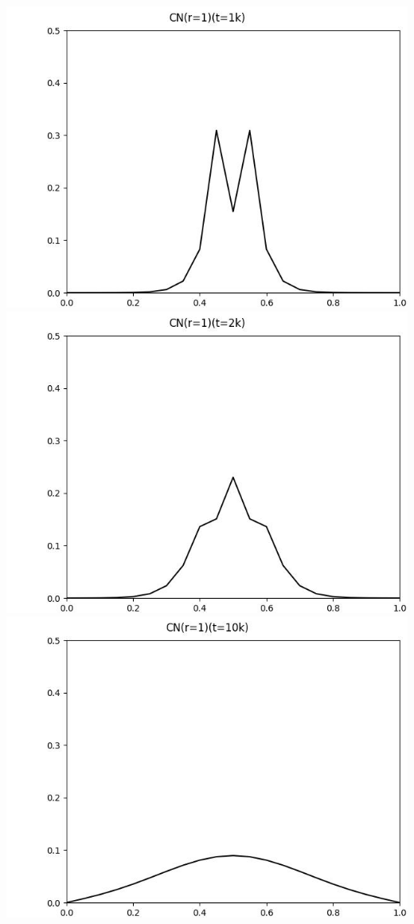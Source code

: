 \documentclass[12pt]{ctexart}
\begin{document}
\includegraphics[scale=0.35]{CN(r=1)(t=1k).jpg}
\includegraphics[scale=0.35]{CN(r=1)(t=2k).jpg}
\includegraphics[scale=0.35]{CN(r=1)(t=10k).jpg}
\end{document}
